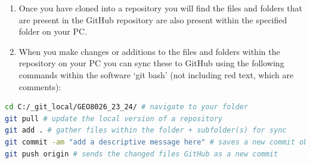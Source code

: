 \documentclass[11pt,onecolumn,a4paper,notitlepage]{article}
\begin{document}
\begin{enumerate}
\item{Once you have cloned into a repository you will find the files and folders that are present in the GitHub repository are also present within the specified folder on your PC.}

\item{When you make changes or additions to the files and folders within the repository on your PC you can sync these to GitHub using the following commands within the software `git bash' (not including red text, which are comments):}

\end{enumerate}

\begin{lstlisting}[language=bash]
cd C:/_git_local/GEO8026_23_24/ # navigate to your folder
git pull # update the local version of a repository
git add . # gather files within the folder + subfolder(s) for sync
git commit -am "add a descriptive message here" # saves a new commit object 
git push origin # sends the changed files GitHub as a new commit
\end{lstlisting}
\end{document}
